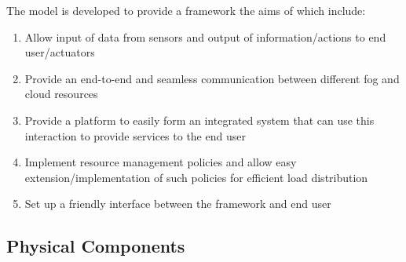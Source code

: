 \documentclass[AMA,STIX1COL]{WileyNJD-v2}
\begin{document}
The model is developed to provide a framework the aims of which include:
\begin{enumerate}
\item Allow input of data from sensors and output of information/actions to end user/actuators
\item Provide an end-to-end and seamless communication between different fog and cloud resources
\item Provide a platform to easily form an integrated system that can use this interaction to provide services to the end user
\item Implement resource management policies and allow easy extension/implementation of such policies for efficient load distribution
\item Set up a friendly interface between the framework and end user
\end{enumerate}

\subsection{Physical Components}
\end{document}
